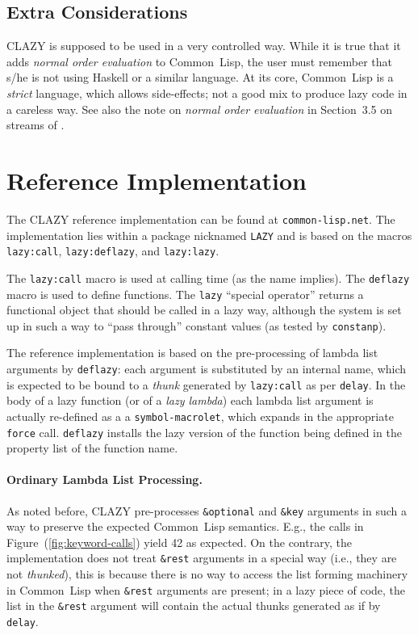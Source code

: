 \documentclass[fleqn,10pt]{article}
\newcommand{\CL}{\textsf{Common~Lisp}}
\newcommand{\CLAZY}{\textsf{CLAZY}}
\newcommand{\code}[1]{\texttt{#1}}
\begin{document}
\subsection{Extra Considerations}

\CLAZY{} is supposed to be used in a very controlled way.  While it is
true that it adds \emph{normal order evaluation} to \CL{}, the user
must remember that s/he is not using Haskell or a similar language.
At its core, \CL{} is a \emph{strict} language, which allows
side-effects; not a good mix to produce lazy code in a careless way.
See also the note on \emph{normal order evaluation} in Section~3.5 on
streams of \cite{SICP}.





\section{Reference Implementation}

The \CLAZY{} reference implementation can be found
at \texttt{common-lisp.net}.
The implementation lies within a package nicknamed \code{LAZY} and
is based on the macros \code{lazy:call}, \code{lazy:deflazy}, and
\code{lazy:lazy}.


The \code{lazy:call} macro is used at calling time (as the name
implies).  The \code{deflazy} macro is used to define functions.
The \code{lazy} ``special operator'' returns a functional
object that should be called in a lazy way, although the system is set
up in such a way to ``pass through'' constant values (as
tested by \code{constanp}).


The reference implementation is based on the pre-processing of lambda
list arguments by \code{deflazy}: each argument is substituted by an
internal name, which is expected to be bound to a \emph{thunk}
generated by \code{lazy:call} as per \code{delay}.  In the body of a
lazy function (or of a \emph{lazy lambda}) each lambda list argument
is actually re-defined as a a \code{symbol-macrolet}, which expands in
the appropriate \code{force} call.  \code{deflazy} installs the lazy
version of the function being defined in the property list of the
function name.

\paragraph{Ordinary Lambda List Processing.} As noted before, \CLAZY{}
pre-processes \code{\&optional} and \code{\&key} arguments in such a
way to preserve the expected \CL{} semantics.  E.g., the
calls in Figure~(\ref{fig:keyword-calls}) yield 42 as expected.  On
the contrary, the implementation does not treat \code{\&rest}
arguments in a special way (i.e., they are not \emph{thunked}), this
is because there is no way to access the list forming machinery in
\CL{} when \code{\&rest} arguments are present; in a lazy piece of
code, the list in the \code{\&rest} argument will contain the actual
thunks generated as if by \code{delay}.
\end{document}
